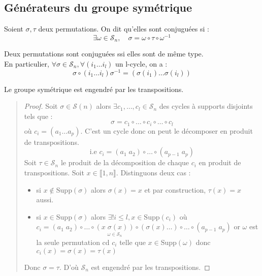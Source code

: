 \subsection{Générateurs du groupe symétrique}

\begin{definition}[Conjugaison]
		Soient $\sigma, \tau$ deux permutations. On dit qu'elles sont conjuguées si :
		\[ \boxed{ \exists \omega \in \mathcal{S}_n, \quad \sigma = \omega \circ \tau \circ \omega ^{-1} } \]
\end{definition}

\begin{prop}[Conjugaison]
		Deux permutations sont conjuguées ssi elles sont de même type. \\ 
		En particulier, $\forall \sigma \in \mathcal{S}_n, \forall (i_1 \dots i_l)$ un l-cycle, on a :
			\[ \sigma \circ (i_1 \dots i_l) \sigma^{-1} = (\sigma(i_1) \dots \sigma(i_l)) \]
\end{prop}

\begin{theorem}[Générateurs]
		Le groupe symétrique est engendré par les transpositions.
\end{theorem}

\begin{quote}
\footnotesize
\begin{proof}
	Soit $ \sigma \in \mathcal{S}(n)$ alors $\exists c_1, \dots, c_l \in \mathcal{S}_n$ des cycles à supports disjoints tels que : 
		\[ \sigma = c_1 \circ \dots \circ c_i \circ \dots \circ c_l \] 
	où $c_i = (a_1 \dots a_p)$. C'est un cycle donc on peut le décomposer en produit de transpositions.
		\[ \text{i.e } c_i = (a_1 \; a_2) \circ \dots \circ (a_{p-1} \; a_p) \] 
	Soit $\tau \in \mathcal{S}_n$ le produit de la décomposition de chaque $c_i$ en produit de transpositions. 
	Soit $x \in \llbracket 1,n \rrbracket$. Distinguons deux cas :
	\begin{itemize}
		\item si $x \not \in \text{Supp}(\sigma)$ alors $\sigma(x) = x$ et par construction, $\tau(x) = x$ aussi.
		\item si $x \in \text{Supp}(\sigma)$ alors $ \exists! i \leq l, x \in \text{Supp}(c_i)$ où 
			$c_i = (a_1 \; a_2) \circ \dots \circ \underset{\omega \in \mathcal{S}_n}{(x \; \sigma(x))} \circ (\sigma(x) \dots) \circ \dots \circ (a_{p-1} \; a_p) $
			or $\omega$ est la seule permutation cd $c_i$ telle que $x \in \text{Supp}(\omega)$ donc $c_i(x) = \sigma(x) = \tau(x)$
	\end{itemize}
	Donc $\sigma = \tau$. D'où $\mathcal{S}_n$ est engendré par les transpositions.
\end{proof}
\normalsize
\end{quote}

